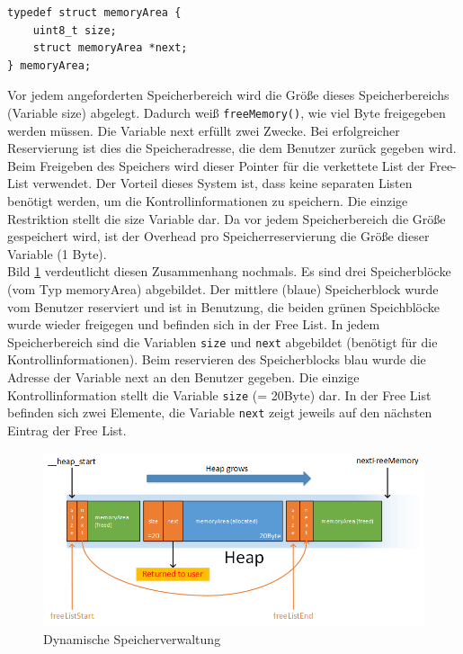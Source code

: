 \documentclass[fontsize=12pt, toc=bibliography, notitlepage]{scrreprt}
\begin{document}
\begin{lstlisting}[title=memory.c]
typedef struct memoryArea {
    uint8_t size;
    struct memoryArea *next;
} memoryArea;
\end{lstlisting}

Vor jedem angeforderten Speicherbereich wird die Größe dieses Speicherbereichs (Variable size) abgelegt. Dadurch weiß \lstinline$freeMemory()$, wie viel Byte freigegeben werden müssen. Die Variable next erfüllt zwei Zwecke. Bei erfolgreicher Reservierung ist dies die Speicheradresse, die dem Benutzer zurück gegeben wird. Beim Freigeben des Speichers wird dieser Pointer für die verkettete List der Free-List verwendet. Der Vorteil dieses System ist, dass keine separaten Listen benötigt werden, um die Kontrollinformationen zu speichern. Die einzige Restriktion stellt die size Variable dar. Da vor jedem Speicherbereich die Größe gespeichert wird, ist der Overhead pro Speicherreservierung die Größe dieser Variable (1 Byte). \\

Bild \ref{fig:memory} verdeutlicht diesen Zusammenhang nochmals. Es sind drei Speicherblöcke (vom Typ memoryArea) abgebildet. Der mittlere (blaue) Speicherblock wurde vom Benutzer reserviert und ist in Benutzung, die beiden grünen Speichblöcke wurde wieder freigegen und befinden sich in der Free List. In jedem Speicherbereich sind die Variablen \lstinline{size} und \lstinline{next} abgebildet (benötigt für die Kontrollinformationen). Beim reservieren des Speicherblocks blau wurde die Adresse der Variable next an den Benutzer gegeben. Die einzige Kontrollinformation stellt die Variable \lstinline{size} (= 20Byte) dar. In der Free List befinden sich zwei Elemente, die Variable \lstinline{next} zeigt jeweils auf den nächsten Eintrag der Free List.

\begin{figure}[H]
	\centering
	\includegraphics[width=450px]{images/memory.png}
	\caption{Dynamische Speicherverwaltung}
	\label{fig:memory}
\end{figure}
\end{document}
